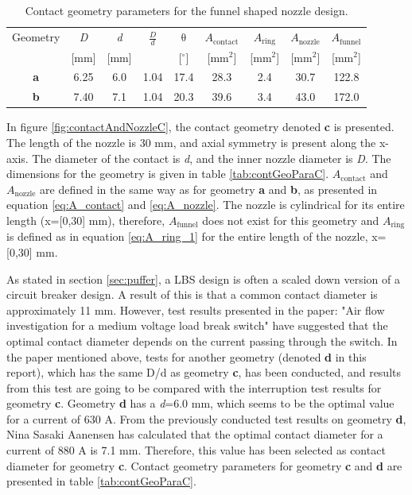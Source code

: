 \documentclass[10pt,b5paper,twoside]{article}
\begin{document}
\begin{table}[H]
\center
\caption{Contact geometry parameters for the funnel shaped nozzle design.}
 \begin{tabular}{|c|c|c|c|c|c|c|c|c|}
\hline 
Geometry & \textit{D} & \textit{d}  & $\frac{D}{d}$ & $\mathrm{\theta}$ & $A_\mathrm{{contact}}$ & $A_\mathrm{{ring}}$  & $A_\mathrm{{nozzle}}$ & $A_\mathrm{{funnel}}$ \\
  & [mm] &  [mm] &   & [$^{\circ}$]  &   [mm$^2$] &  [mm$^2$] &   [mm$^2$] &   [mm$^2$]\\
\hline 
\textbf{a} & 6.25 & 6.0 & 1.04 & 17.4 & 28.3 & 2.4 & 30.7 & 122.8\\ 
\hline 
\textbf{b} & 7.40 & 7.1 & 1.04 & 20.3 & 39.6 & 3.4 & 43.0 & 172.0\\ 
\hline 
\end{tabular} 
\label{tab:contGeoPara}
\end{table}

In figure \ref{fig:contactAndNozzleC}, the contact geometry denoted \textbf{c} is presented. The length of the nozzle is 30 mm, and axial symmetry is present along the x-axis. The diameter of the contact is \textit{d}, and the inner nozzle diameter is \textit{D}. The dimensions for the geometry is given in table \ref{tab:contGeoParaC}. $A_\mathrm{{contact}}$ and $A_\mathrm{{nozzle}}$ are defined in the same way as for geometry \textbf{a} and \textbf{b}, as presented in equation \eqref{eq:A_contact} and \eqref{eq:A_nozzle}. The nozzle is cylindrical for its entire length (x=[0,30] mm), therefore, $A_\mathrm{{funnel}}$ does not exist for this geometry and $A_\mathrm{{ring}}$ is defined as in equation \eqref{eq:A_ring_1} for the entire length of the nozzle, x=[0,30] mm. 

As stated in section \ref{sec:puffer}, a LBS design is often a scaled down version of a circuit breaker design. A result of this is that a common contact diameter is approximately 11 mm. However, test results presented in the paper: "Air flow investigation for a medium voltage load break switch" \cite{bib:AFIMVLBA} have suggested that the optimal contact diameter depends on the current passing through the switch. In the paper mentioned above, tests for another geometry (denoted \textbf{d} in this report), which has the same D/d as geometry \textbf{c}, has been conducted, and results from this test are going to be compared with the interruption test results for geometry \textbf{c}. Geometry \textbf{d} has a \textit{d}=6.0 mm, which seems to be the optimal value for a current of 630 A. From the previously conducted test results on geometry \textbf{d}, Nina Sasaki Aanensen has calculated that the optimal contact diameter for a current of 880 A is 7.1 mm. Therefore, this value has been selected as contact diameter for geometry \textbf{c}. Contact geometry parameters for geometry \textbf{c} and \textbf{d} are presented in table \ref{tab:contGeoParaC}.
\end{document}
